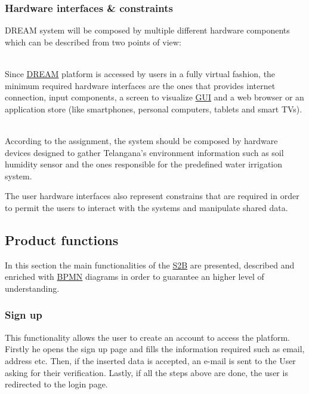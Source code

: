 \subsubsection{Hardware interfaces \& constraints}
DREAM system will be composed by multiple different hardware components which can be described from two points of view:
\begin{description}[font=~\normalfont\scshape]
    \item[\textbf{\textcolor{myblue}{user perspective}}] \hfill \\Since \hyperref[tab:acronymsTable]{DREAM} platform is accessed by users in a fully virtual fashion, the minimum required hardware interfaces are the ones that provides internet connection, input components, a screen to visualize \hyperref[tab:acronymsTable]{GUI} and a web browser or an application store (like smartphones, personal computers, tablets and smart TVs).
    \item[\textbf{\textcolor{myblue}{system perspective}}] \hfill \\According to the assignment, the system should be composed by hardware devices designed to gather Telangana's environment information such as soil humidity sensor and the ones responsible for the predefined water irrigation system.
\end{description}
The user hardware interfaces also represent constrains that are required in order to permit the users to interact with the systems and manipulate shared data.

\subsection{Product functions}
\label{sect:product_functions}
In this section the main functionalities of the \hyperref[tab:acronymsTable]{S2B} are presented, described and enriched with \hyperref[tab:acronymsTable]{BPMN} diagrams in order to guarantee an higher level of understanding.
\subsubsection{Sign up}
This functionality allows the user to create an account to access the platform.
Firstly he opens the sign up page and fills the information required such as email, address etc.
Then, if the inserted data is accepted, an e-mail is sent to the User asking for their verification.
Lastly, if all the steps above are done, the user is redirected to the login page.

